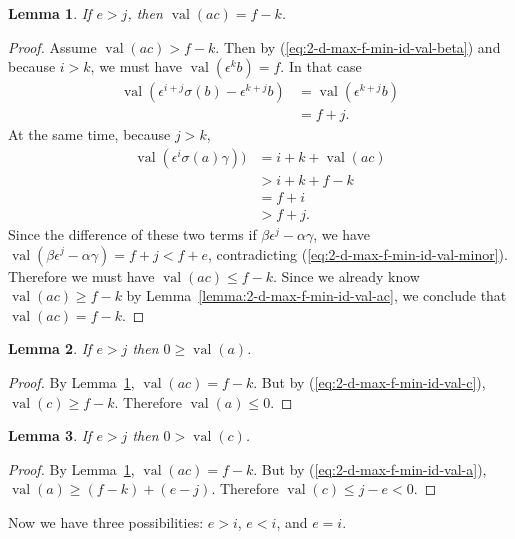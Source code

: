 \documentclass{amsart}
\newtheorem{lemma}{Lemma}[subsection]
\theoremstyle{definition}
\def\e{\epsilon}
\def\val{\mathop{\mathrm{val}}}
\def\s{\sigma}
\begin{document}
  \begin{lemma}
    \label{lemma:2-d-max-f-min-id-e-g-j-val-ac}
    If $e > j$, then $\val(ac) = f - k$.
  \end{lemma}
  \begin{proof}
    Assume $\val(ac) > f - k$.  Then by (\ref{eq:2-d-max-f-min-id-val-beta})
    and because $i > k$, we must have $\val(\e^k b) = f$.  In that case
    \begin{align*}
      \val(\e^{i+j}\s(b) - \e^{k+j}b) &= \val(\e^{k+j}b) \\
      &= f + j.
    \end{align*}
    At the same time, because $j > k$,
    \begin{align*}
      \val(\e^i \s(a) \gamma)) &= i + k + \val(ac) \\
      &> i + k + f - k \\
      &= f + i \\
      &> f + j.
    \end{align*}
    Since the difference of these two terms if $\beta\e^j - \alpha\gamma$, we
    have $\val(\beta\e^j - \alpha\gamma) = f + j < f + e$, contradicting
    (\ref{eq:2-d-max-f-min-id-val-minor}).  Therefore we must have $\val(ac)
    \le f - k$.  Since we already know $\val(ac) \ge f-k$ by
    Lemma~\ref{lemma:2-d-max-f-min-id-val-ac}, we conclude that $\val(ac) = f -
    k$.
  \end{proof}

  \begin{lemma}
    \label{lemma:2-d-max-f-min-id-e-g-j-val-a}
    If $e > j$ then $0 \ge \val(a)$.
  \end{lemma}
  \begin{proof}
    By Lemma~\ref{lemma:2-d-max-f-min-id-e-g-j-val-ac}, $\val(ac) = f - k$.
    But by (\ref{eq:2-d-max-f-min-id-val-c}), $\val(c) \ge f - k$.  Therefore
    $\val(a) \le 0$.
  \end{proof}

  \begin{lemma}
    \label{lemma:2-d-max-f-min-id-e-g-j-val-c}
    If $e > j$ then $0 > \val(c)$.
  \end{lemma}
  \begin{proof}
    By Lemma~\ref{lemma:2-d-max-f-min-id-e-g-j-val-ac}, $\val(ac) = f - k$.
    But by (\ref{eq:2-d-max-f-min-id-val-a}), $\val(a) \ge (f - k) + (e-j)$.
    Therefore $\val(c) \le j - e < 0$.
  \end{proof}

  Now we have three possibilities: $e > i$, $e < i$, and $e = i$.
\end{document}
